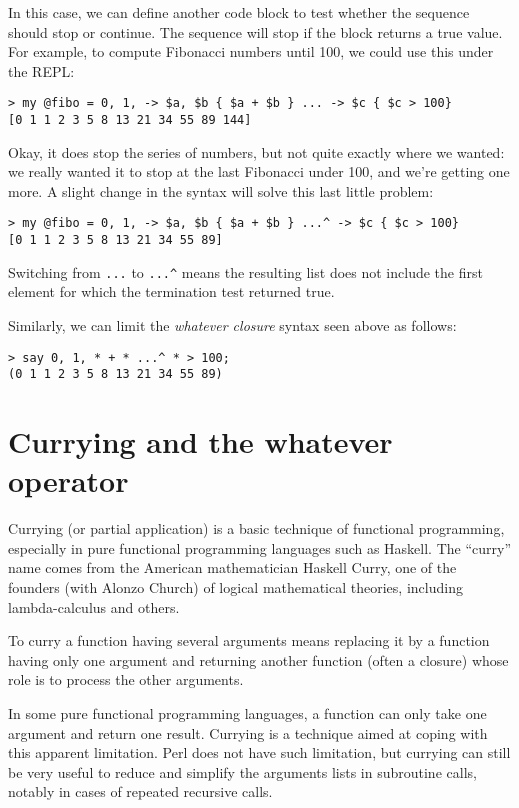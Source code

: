 In this case, we can define another code block to test 
whether the sequence should stop or continue. The sequence 
will stop if the block returns a true value. For example, 
to compute Fibonacci numbers until 100, we could use this 
under the REPL:

\begin{verbatim}
> my @fibo = 0, 1, -> $a, $b { $a + $b } ... -> $c { $c > 100}
[0 1 1 2 3 5 8 13 21 34 55 89 144]
\end{verbatim}

Okay, it does stop the series of numbers, but not quite exactly 
where we wanted: we really wanted it to stop at the last 
Fibonacci under 100, and we're getting one more. A slight 
change in the syntax will solve this last little problem:

\begin{verbatim}
> my @fibo = 0, 1, -> $a, $b { $a + $b } ...^ -> $c { $c > 100}
[0 1 1 2 3 5 8 13 21 34 55 89]
\end{verbatim}

Switching from \verb'...' to \verb'...^' means the 
resulting list does not include the first element 
for which the termination test returned true.

Similarly, we can limit the \emph{whatever closure} 
syntax seen above as follows:

\begin{verbatim}
> say 0, 1, * + * ...^ * > 100;
(0 1 1 2 3 5 8 13 21 34 55 89)
\end{verbatim}

\section{Currying and the whatever operator}

Currying (or partial application) is a basic technique 
of functional programming, especially in pure functional 
programming languages such as Haskell. The ``curry'' name comes 
from the American mathematician Haskell Curry, one of the 
founders (with Alonzo Church) of logical mathematical 
theories, including lambda-calculus and others.

To curry a function having several arguments means replacing 
it by a function having only one argument and returning 
another function (often a closure) whose role is to 
process the other arguments.

In some pure functional programming languages, a function 
can only take one argument and return one result. Currying 
is a technique aimed at coping with this apparent limitation. 
Perl does not have such limitation, but currying can still 
be very useful to reduce and simplify the arguments lists 
in subroutine calls, notably in cases of repeated recursive 
calls.


